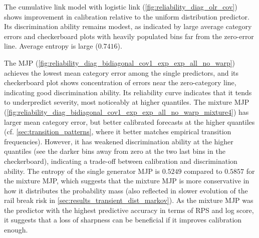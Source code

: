 The cumulative link model with logistic link (\cref{fig:reliability_diag_olr_cov}) shows improvement in calibration relative to the uniform distribution predictor.
Its discrimination ability remains modest, as indicated by large average category errors and checkerboard plots with heavily populated bins far from the zero-error line. Average entropy is large ($0.7416$).

The MJP (\cref{fig:reliability_diag_bidiagonal_cov1_exp_exp_all_no_warp}) achieves the lowest mean category error among the single predictors, and its checkerboard plot shows concentration of errors near the zero-category line, indicating good discrimination ability.
Its reliability curve indicates that it tends to underpredict severity, most noticeably at higher quantiles.
The mixture MJP (\cref{fig:reliability_diag_bidiagonal_cov1_exp_exp_all_no_warp_mixture4}) has larger mean category error, but better calibrated forecasts at the higher quantiles (cf. \cref{sec:transition_patterns}, where it better matches empirical transition frequencies). However, it has weakened discrimination ability at the higher quantiles (see the darker bins away from zero at the two last bins in the checkerboard), indicating a trade-off between calibration and discrimination ability.
The entropy of the single generator MJP is $0.5249$ compared to $0.5857$ for the mixture MJP, which suggests that the mixture MJP is more conservative in how it distributes the probability mass (also reflected in slower evolution of the rail break risk in \cref{sec:results_transient_dist_markov}). As the mixture MJP was the predictor with the highest predictive accuracy in terms of RPS and log score, it suggests that a loss of sharpness can be beneficial if it improves calibration enough.



